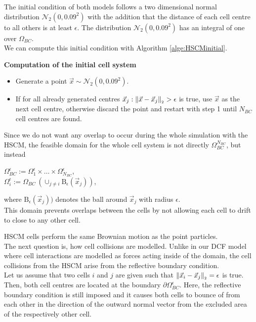 The initial condition of both models follows a two dimensional normal distribution $\mathcal{N}_2(0,0.09^2)$ with the addition that the distance of each cell centre to all others is at least $\epsilon$.  
The distribution $\mathcal{N}_2(0,0.09^2)$ has an integral of one over $\Omega_{BC}$. \\
We can compute this initial condition with Algorithm \ref{alge:HSCMinitial}.
\begin{algorithm} \textbf{Computation of the initial cell system} \label{alge:HSCMinitial}
	\begin{itemize} 
		\item Generate a point $\vec{x} \sim \mathcal{N}_2(0,0.09^2)$. 
		\item If for all already generated centres $\vec{x}_j: \norm[\vec{x} - \vec{x}_j] > \epsilon$ is true, use $\vec{x}$ as the next cell centre, otherwise discard the point and restart with step 1 until $N_{BC}$ cell centres are found. 
	\end{itemize}	
\end{algorithm}

Since we do not want any overlap to occur during the whole simulation with the HSCM, the feasible domain for the whole cell system is not directly $\Omega_{BC}^{N_{BC}}$, but instead 
\begin{center}
    $\Omega_{BC}^{\epsilon} := \Omega_1^{\epsilon} \times \ldots \times \Omega_{N_{BC}}^{\epsilon}$, \\
    $\Omega_{i}^{\epsilon} := \Omega_{BC} \ ( \cup_{j \neq i} \mathrm{B}_{\epsilon}(\vec{x}_j))$,
\end{center}
where $\mathrm{B}_{\epsilon}(\vec{x}_j))$ denotes the ball around $\vec{x}_j$ with radius $\epsilon$. \\
This domain prevents overlaps between the cells by not allowing each cell to drift to close to any other cell.  

HSCM cells perform the same Brownian motion as the point particles. \\
The next question is, how cell collisions are modelled. 
Unlike in our DCF model where cell interactions are modelled as forces acting inside of the domain, the cell collisions from the HSCM arise from the reflective boundary condition. \\
Let us assume that two cells $i$ and $j$ are given such that $\norm[\vec{x}_i - \vec{x}_j] = \epsilon$ is true. 
Then, both cell centres are located at the boundary $\partial \Omega_{BC}^{\epsilon}$. 
Here, the reflective boundary condition is still imposed and it causes both cells to bounce of from each other in the direction of the outward normal vector from the excluded area of the respectively other cell. \\ 

